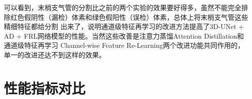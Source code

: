 可以看到，末梢支气管的分割比之前的两个实验的效果要好得多，虽然不能完全排除红色假阴性（漏检）体素和绿色假阳性（误检）体素，总体上将末梢支气管这些精细特征都给分割
出来了，说明通道级特征再学习的改进方法提高了3D-UNet + AD + FRL网络模型的性能。当然这些改善是注意力蒸馏Attention Distillation和通道级特征再学习
Channel-wise Feature Re-Learning两个改进功能共同作用的，单一的改进还达不到这样的效果。

%

\section{性能指标对比}

